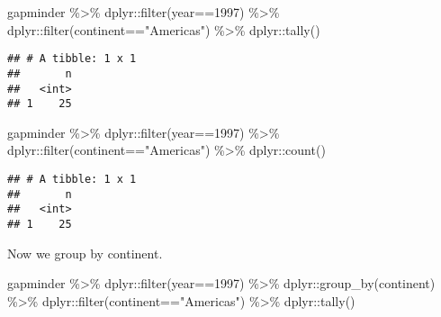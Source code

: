 \documentclass[
]{book}
\newenvironment{Shaded}{\begin{snugshade}}{\end{snugshade}}
\newcommand{\DecValTok}[1]{\textcolor[rgb]{0.00,0.00,0.81}{#1}}
\newcommand{\FunctionTok}[1]{\textcolor[rgb]{0.00,0.00,0.00}{#1}}
\newcommand{\NormalTok}[1]{#1}
\newcommand{\SpecialCharTok}[1]{\textcolor[rgb]{0.00,0.00,0.00}{#1}}
\newcommand{\StringTok}[1]{\textcolor[rgb]{0.31,0.60,0.02}{#1}}
\begin{document}
\begin{Shaded}
\begin{Highlighting}[]
\NormalTok{gapminder }\SpecialCharTok{\%\textgreater{}\%}\NormalTok{ dplyr}\SpecialCharTok{::}\FunctionTok{filter}\NormalTok{(year}\SpecialCharTok{==}\DecValTok{1997}\NormalTok{) }\SpecialCharTok{\%\textgreater{}\%}
\NormalTok{  dplyr}\SpecialCharTok{::}\FunctionTok{filter}\NormalTok{(continent}\SpecialCharTok{==}\StringTok{"Americas"}\NormalTok{) }\SpecialCharTok{\%\textgreater{}\%}
\NormalTok{  dplyr}\SpecialCharTok{::}\FunctionTok{tally}\NormalTok{()}
\end{Highlighting}
\end{Shaded}

\begin{verbatim}
## # A tibble: 1 x 1
##       n
##   <int>
## 1    25
\end{verbatim}

\begin{Shaded}
\begin{Highlighting}[]
\NormalTok{gapminder }\SpecialCharTok{\%\textgreater{}\%}\NormalTok{ dplyr}\SpecialCharTok{::}\FunctionTok{filter}\NormalTok{(year}\SpecialCharTok{==}\DecValTok{1997}\NormalTok{) }\SpecialCharTok{\%\textgreater{}\%}
\NormalTok{  dplyr}\SpecialCharTok{::}\FunctionTok{filter}\NormalTok{(continent}\SpecialCharTok{==}\StringTok{"Americas"}\NormalTok{) }\SpecialCharTok{\%\textgreater{}\%}
\NormalTok{  dplyr}\SpecialCharTok{::}\FunctionTok{count}\NormalTok{()}
\end{Highlighting}
\end{Shaded}

\begin{verbatim}
## # A tibble: 1 x 1
##       n
##   <int>
## 1    25
\end{verbatim}

Now we group by continent.

\begin{Shaded}
\begin{Highlighting}[]
\NormalTok{gapminder }\SpecialCharTok{\%\textgreater{}\%}\NormalTok{ dplyr}\SpecialCharTok{::}\FunctionTok{filter}\NormalTok{(year}\SpecialCharTok{==}\DecValTok{1997}\NormalTok{) }\SpecialCharTok{\%\textgreater{}\%}
\NormalTok{  dplyr}\SpecialCharTok{::}\FunctionTok{group\_by}\NormalTok{(continent) }\SpecialCharTok{\%\textgreater{}\%}
\NormalTok{  dplyr}\SpecialCharTok{::}\FunctionTok{filter}\NormalTok{(continent}\SpecialCharTok{==}\StringTok{"Americas"}\NormalTok{) }\SpecialCharTok{\%\textgreater{}\%}
\NormalTok{  dplyr}\SpecialCharTok{::}\FunctionTok{tally}\NormalTok{()}
\end{Highlighting}
\end{Shaded}
\end{document}
